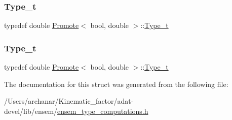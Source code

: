 \subsubsection{\texorpdfstring{Type\_t}{Type\_t}\hspace{0.1cm}{\footnotesize\ttfamily [2/3]}}
{\footnotesize\ttfamily typedef double \mbox{\hyperlink{structPromote}{Promote}}$<$ bool, double $>$\+::\mbox{\hyperlink{structPromote_3_01bool_00_01double_01_4_a89d90c1b19975ea58462741364f3d29e}{Type\+\_\+t}}}

\mbox{\label{structPromote_3_01bool_00_01double_01_4_a89d90c1b19975ea58462741364f3d29e}} 
\subsubsection{\texorpdfstring{Type\_t}{Type\_t}\hspace{0.1cm}{\footnotesize\ttfamily [3/3]}}
{\footnotesize\ttfamily typedef double \mbox{\hyperlink{structPromote}{Promote}}$<$ bool, double $>$\+::\mbox{\hyperlink{structPromote_3_01bool_00_01double_01_4_a89d90c1b19975ea58462741364f3d29e}{Type\+\_\+t}}}



The documentation for this struct was generated from the following file\+:\begin{DoxyCompactItemize}
\item 
/\+Users/archanar/\+Kinematic\+\_\+factor/adat-\/devel/lib/ensem/\mbox{\hyperlink{adat-devel_2lib_2ensem_2ensem__type__computations_8h}{ensem\+\_\+type\+\_\+computations.\+h}}\end{DoxyCompactItemize}
